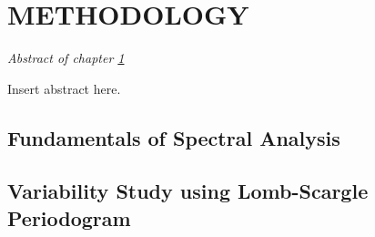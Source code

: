 \chapter{METHODOLOGY} \label{chap:methodology}
    \minitoc
    
    \newpage
    \begin{center}
    	\emph{Abstract of chapter \ref{chap:methodology}}
    \end{center}
    
    Insert abstract here.
    
    \section{Fundamentals of Spectral Analysis} \label{methodology:spectral}
    	
    	
    \section{Variability Study using Lomb-Scargle Periodogram} \label{methodology:variability}
    	